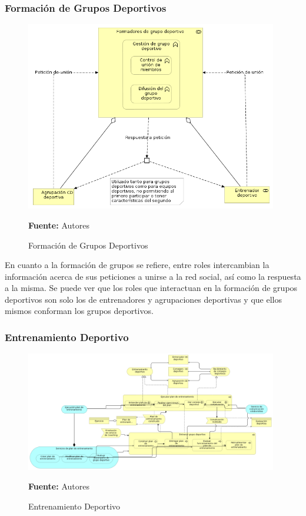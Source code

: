 \subsubsection{Formación de Grupos Deportivos}

\begin{figure}[!htb]
  \begin{center}
    \includegraphics[width=11cm]{./imagenes/business_functions/formaciongruposdeportivos.png}
    \caption{Formación de Grupos Deportivos}
    \label{fig:bf_formacion_grupos_deportivos}
    \textbf{Fuente:}  Autores
  \end{center}
\end{figure}

En cuanto a la formación de grupos se refiere, entre roles intercambian la información acerca de sus peticiones a unirse a la red social, así como la respuesta a la misma. Se puede ver que los roles que interactuan en la formación de grupos deportivos son solo los de entrenadores y agrupaciones deportivas y que ellos mismos conforman los grupos deportivos.

\subsubsection{Entrenamiento Deportivo}

\begin{figure}[!htb]
  \begin{center}
    \includegraphics[width=11cm]{./imagenes/business_functions/entrenamientodeportivo.png}
    \caption{Entrenamiento Deportivo}
    \label{fig:bf_entrenamiento_deportivo}
    \textbf{Fuente:}  Autores
  \end{center}
\end{figure}

